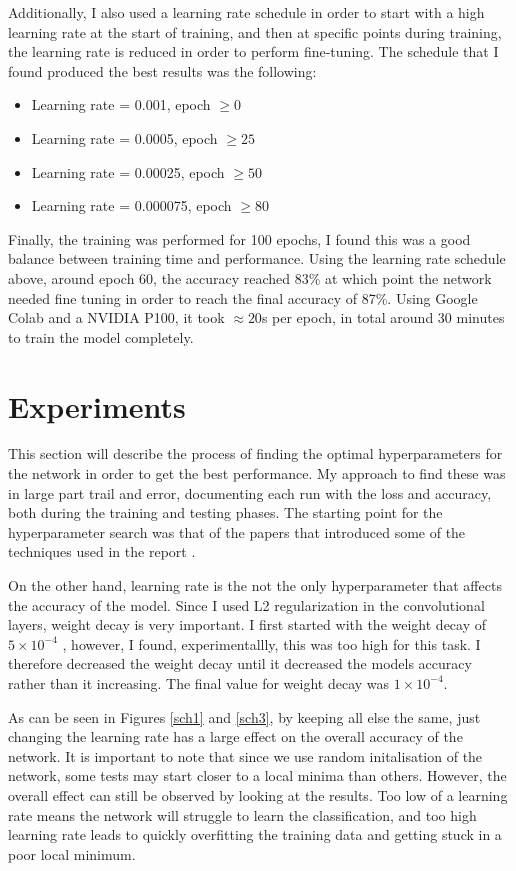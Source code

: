 \documentclass[12pt]{article}
\begin{document}
Additionally, I also used a learning rate schedule in order to start with a high learning rate at the start of training, and then at specific points during training, the learning rate is reduced in order to perform fine-tuning. The schedule that I found produced the best results was the following:

\begin{itemize}
  \item Learning rate = 0.001, epoch $\geq 0$
  \item Learning rate = 0.0005, epoch $\ge 25$
  \item Learning rate = 0.00025, epoch $\ge 50$
  \item Learning rate = 0.000075, epoch $\ge 80$
\end{itemize}

Finally, the training was performed for 100 epochs, I found this was a good balance between training time and performance. Using the learning rate schedule above, around epoch 60, the accuracy reached 83\% at which point the network needed fine tuning in order to reach the final accuracy of 87\%. Using Google Colab and a NVIDIA P100, it took $\approx 20$s per epoch, in total around 30 minutes to train the model completely.

\section{Experiments}
This section will describe the process of finding the optimal hyperparameters for the network in order to get the best performance. My approach to find these was in large part trail and error, documenting each run with the loss and accuracy, both during the training and testing phases. The starting point for the hyperparameter search was that of the papers that introduced some of the techniques used in the report \cite{simonyan2014deep}.

On the other hand, learning rate is the not the only hyperparameter that affects the accuracy of the model. Since I used L2 regularization in the convolutional layers, weight decay is very important. I first started with the weight decay of $5\times 10^{-4}$ \cite{simonyan2014deep}, however, I found, experimentallly, this was too high for this task. I therefore decreased the weight decay until it decreased the models accuracy rather than it increasing. The final value for weight decay was $1\times 10^{-4}$.

As can be seen in Figures \ref{sch1} and \ref{sch3}, by keeping all else the same, just changing the learning rate has a large effect on the overall accuracy of the network. It is important to note that since we use random initalisation of the network, some tests may start closer to a local minima than others. However, the overall effect can still be observed by looking at the results. Too low of a learning rate means the network will struggle to learn the classification, and too high learning rate leads to quickly overfitting the training data and getting stuck in a poor local minimum.
\end{document}
